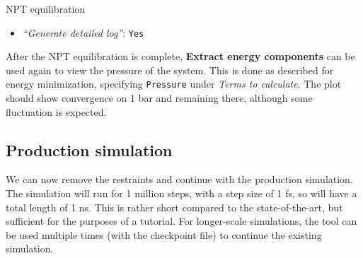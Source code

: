 \documentclass[twocolumn]{bmcart}%
\providecommand{\tightlist}{%
  \setlength{\itemsep}{0pt}\setlength{\parskip}{0pt}}
\begin{document}
\begin{handson_box_colour}{NPT
equilibration}
\begin{itemize}
\begin{itemize}
      \begin{itemize}
      \tightlist
      \item
        \emph{``Bond constraints (constraints)''}:
        \texttt{All\ bonds\ (all-bonds).}
      \item
        \emph{``Temperature /K''}: \texttt{300}
      \item
        \emph{``Step length in ps''}: \texttt{0.002}
      \item
        \emph{``Number of steps that elapse between saving data points
        (velocities, forces, energies)''}: \texttt{1000}
      \item
        \emph{``Number of steps for the simulation''}: \texttt{50000}
      \end{itemize}
    \end{itemize}
  \item
    \emph{``Generate detailed log''}: \texttt{Yes}
  \end{itemize}

\end{handson_box_colour}

After the NPT equilibration is complete, \textbf{Extract energy components} can be used again to view the pressure of the system. This is done as described for energy minimization, specifying \texttt{Pressure} under \emph{Terms to calculate}. The plot should show convergence on 1 bar and remaining there, although some fluctuation is expected.

\subsection*{Production simulation}\label{production-simulation}

We can now remove the restraints and continue with the production simulation. The simulation will run for 1 million steps, with a step size of 1 fs, so will have a total length of 1 ns. This is rather short compared to the state-of-the-art, but sufficient for the purposes of a tutorial. For longer-scale simulations, the tool can be used multiple times (with the checkpoint file) to continue the existing simulation.
\end{document}
